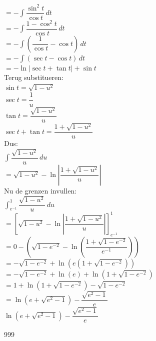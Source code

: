 \documentclass[a4paper]{article}
\begin{document}
$=
-\displaystyle \int
\dfrac{\sin^2t}{\cos t}\,dt$\\

$=
-\displaystyle \int
\dfrac{1-\cos^2t}{\cos t}\,dt$\\

$=
-\displaystyle \int
\left(\dfrac{1}{\cos t}-\cos t\right)\,dt$\\

$=
-\displaystyle \int
(\sec t-\cos t)\,dt$\\

$=
-\ln|\sec t+\tan t|+\sin t$\\

Terug substitueren:\\

$\sin t=\sqrt{1-u^2}$\\

$\sec t=\dfrac{1}{u}$\\

$\tan t=\dfrac{\sqrt{1-u^2}}{u}$\\

$\sec t+\tan t
=
\dfrac{1+\sqrt{1-u^2}}{u}$\\

Dus:\\

$\displaystyle \int\dfrac{\sqrt{1-u^2}}{u}\,du$\\

$=
\sqrt{1-u^2}
-
\ln
\left|
\dfrac{1+\sqrt{1-u^2}}{u}
\right|$\\

Nu de grenzen invullen:\\

$\displaystyle \int_{e^{-1}}^1
\dfrac{\sqrt{1-u^2}}{u}\,du$\\

$=
\left[
\sqrt{1-u^2}
-
\ln
\left|
\dfrac{1+\sqrt{1-u^2}}{u}
\right|
\right]_{e^{-1}}^1$\\

$=
0
-
\left(
\sqrt{1-e^{-2}}
-
\ln
\left(
\dfrac{1+\sqrt{1-e^{-2}}}{e^{-1}}
\right)
\right)$\\

$=
-\sqrt{1-e^{-2}}
+
\ln
\left(
e(1+\sqrt{1-e^{-2}})
\right)$\\

$=
-\sqrt{1-e^{-2}}
+
\ln(e)
+
\ln(1+\sqrt{1-e^{-2}})$\\

$=
1+\ln(1+\sqrt{1-e^{-2}})
-\sqrt{1-e^{-2}}$\\

$=
\ln(e+\sqrt{e^2-1})
-
\dfrac{\sqrt{e^2-1}}{e}$\\

$\boxed{
\ln(e+\sqrt{e^2-1})
-
\dfrac{\sqrt{e^2-1}}{e}
}$\\

\begin{thebibliography}{999}
\end{thebibliography}
\end{document}
